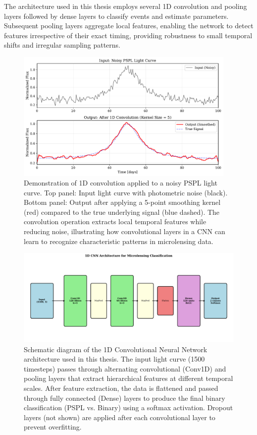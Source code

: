 The architecture used in this thesis employs several 1D convolution and pooling layers followed by dense layers to classify events and estimate parameters. Subsequent pooling layers aggregate local features, enabling the network to detect features irrespective of their exact timing, providing robustness to small temporal shifts and irregular sampling patterns.

\begin{figure}[htbp]
    \centering
    \includegraphics[width=0.95\textwidth]{figures/fig_convolution_example.pdf}
    \caption[Example of 1D convolution on a light curve.]{Demonstration of 1D convolution applied to a noisy PSPL light curve. Top panel: Input light curve with photometric noise (black). Bottom panel: Output after applying a 5-point smoothing kernel (red) compared to the true underlying signal (blue dashed). The convolution operation extracts local temporal features while reducing noise, illustrating how convolutional layers in a CNN can learn to recognize characteristic patterns in microlensing data.}
    \label{fig:convolution_example}
\end{figure}

\begin{figure}[htbp]
    \centering
    \includegraphics[width=\textwidth]{figures/fig_cnn_architecture.pdf}
    \caption[1D CNN architecture for microlensing classification.]{Schematic diagram of the 1D Convolutional Neural Network architecture used in this thesis. The input light curve (1500 timesteps) passes through alternating convolutional (Conv1D) and pooling layers that extract hierarchical features at different temporal scales. After feature extraction, the data is flattened and passed through fully connected (Dense) layers to produce the final binary classification (PSPL vs. Binary) using a softmax activation. Dropout layers (not shown) are applied after each convolutional layer to prevent overfitting.}
    \label{fig:cnn_architecture}
\end{figure}

